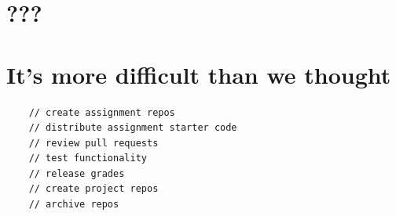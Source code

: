 \documentclass{article}
\begin{document}
\newpage

\section*{???}
\vspace{2ex}
\begin{center}
    \begin{figure}[h]
    \end{figure}
\end{center}

\newpage

\section*{It's more difficult than we thought}
\vspace{2ex}
\begin{verbatim}
    // create assignment repos
    // distribute assignment starter code
    // review pull requests
    // test functionality
    // release grades
    // create project repos
    // archive repos
\end{verbatim}

\newpage
\end{document}
